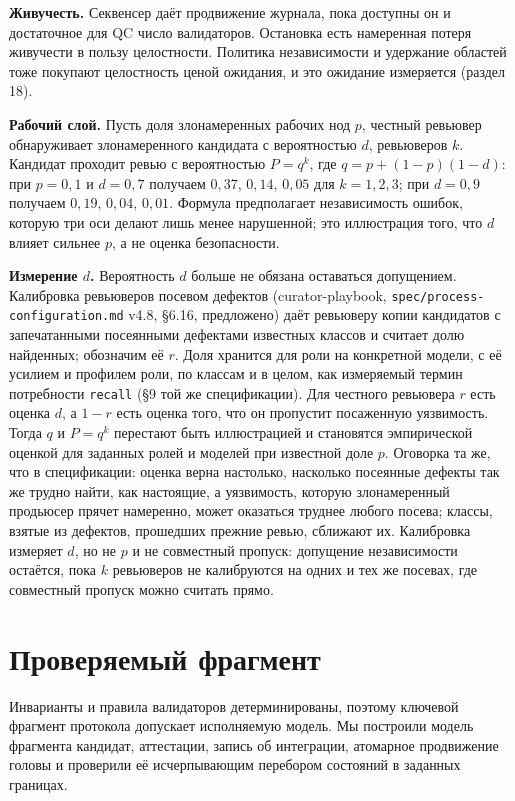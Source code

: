 \documentclass[11pt,a4paper]{article}
\begin{document}
\textbf{Живучесть.} Секвенсер даёт продвижение журнала, пока доступны он и достаточное для QC число валидаторов. Остановка есть намеренная потеря живучести в пользу целостности. Политика независимости и удержание областей тоже покупают целостность ценой ожидания, и это ожидание измеряется (раздел 18).

\textbf{Рабочий слой.} Пусть доля злонамеренных рабочих нод $p$, честный ревьювер обнаруживает злонамеренного кандидата с вероятностью $d$, ревьюверов $k$. Кандидат проходит ревью с вероятностью $P = q^k$, где $q = p + (1-p)(1-d)$: при $p = 0{,}1$ и $d = 0{,}7$ получаем $0{,}37$, $0{,}14$, $0{,}05$ для $k = 1, 2, 3$; при $d = 0{,}9$ получаем $0{,}19$, $0{,}04$, $0{,}01$. Формула предполагает независимость ошибок, которую три оси делают лишь менее нарушенной; это иллюстрация того, что $d$ влияет сильнее $p$, а не оценка безопасности.

\textbf{Измерение $d$.} Вероятность $d$ больше не обязана оставаться допущением. Калибровка ревьюверов посевом дефектов (curator-playbook, \texttt{spec/process-configuration.md} v4.8, §6.16, предложено) даёт ревьюверу копии кандидатов с запечатанными посеянными дефектами известных классов и считает долю найденных; обозначим её $r$. Доля хранится для роли на конкретной модели, с её усилием и профилем роли, по классам и в целом, как измеряемый термин потребности \texttt{recall} (§9 той же спецификации). Для честного ревьювера $r$ есть оценка $d$, а $1 - r$ есть оценка того, что он пропустит посаженную уязвимость. Тогда $q$ и $P = q^k$ перестают быть иллюстрацией и становятся эмпирической оценкой для заданных ролей и моделей при известной доле $p$. Оговорка та же, что в спецификации: оценка верна настолько, насколько посеянные дефекты так же трудно найти, как настоящие, а уязвимость, которую злонамеренный продьюсер прячет намеренно, может оказаться труднее любого посева; классы, взятые из дефектов, прошедших прежние ревью, сближают их. Калибровка измеряет $d$, но не $p$ и не совместный пропуск: допущение независимости остаётся, пока $k$ ревьюверов не калибруются на одних и тех же посевах, где совместный пропуск можно считать прямо.

\section{Проверяемый фрагмент}

Инварианты и правила валидаторов детерминированы, поэтому ключевой фрагмент протокола допускает исполняемую модель. Мы построили модель фрагмента кандидат, аттестации, запись об интеграции, атомарное продвижение головы и проверили её исчерпывающим перебором состояний в заданных границах.
\end{document}
